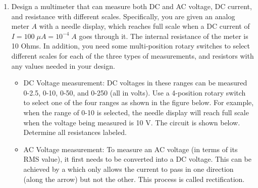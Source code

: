 \begin{enumerate}




\item Design a multimeter that can measure both DC and AC voltage, DC current,
  and resistance with different scales. Specifically, you are given an analog 
  meter $A$ with a needle display, which reaches full scale when a DC current 
  of $I=100\;\mu A=10^{-4}\;A$ goes through it. The internal resistance of the
  meter is 10 Ohms. In addition, you need some multi-position rotary switches 
  to select different scales for each of the three types of measurements, and 
  resistors with any values needed in your design.

  \begin{itemize}
    \item DC Voltage measurement: DC voltages in these ranges can be measured
      0-2.5, 0-10, 0-50, and 0-250 (all in volts). Use a 4-position rotary switch
      to select one of the four ranges as shown in the figure below. For example, 
      when the range of 0-10 is selected, the needle display will reach full scale 
      when the voltage being measured is 10 V. The circuit is shown below. Determine 
      all resistances labeled.


    \item AC Voltage measurement: To measure an AC voltage (in terms of its
      RMS value), it first needs to be converted into a DC voltage. This can 
      be achieved by a 
      which only allows the current to pass in one
      direction (along the arrow) but not the other. This process is called
      rectification. 


\end{itemize}
\end{enumerate}
